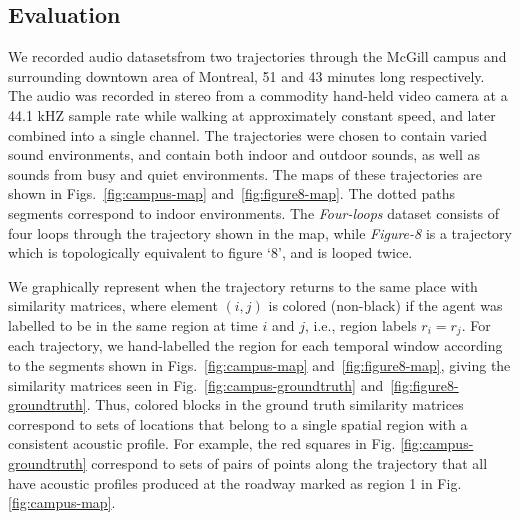 \subsection{Evaluation}

We recorded audio datasetsfrom two trajectories through the McGill campus and surrounding downtown area of Montreal, 51 and 43 minutes long respectively. The audio was recorded in stereo from a commodity hand-held video camera at a 44.1 kHZ sample rate while walking at approximately constant speed, and later combined into a single channel. The trajectories were chosen to contain varied sound environments, and contain both indoor and outdoor sounds, as well as sounds from busy and quiet environments. The maps of these trajectories are shown in Figs.~\ref{fig:campus-map} and~\ref{fig:figure8-map}. The dotted paths segments correspond to indoor environments. The \emph{Four-loops} dataset consists of four loops through the trajectory shown in the map, while \emph{Figure-8} is a trajectory which is topologically equivalent to figure `8', and is looped twice.  

We graphically represent when the trajectory returns to the same place with similarity matrices, where element $(i,j)$ is colored (non-black) if the agent was labelled to be in the same region at time $i$ and $j$, i.e., region labels $r_i = r_j$. For each trajectory, we hand-labelled the region for each temporal window according to the segments shown in Figs.~\ref{fig:campus-map} and~\ref{fig:figure8-map}, giving the similarity matrices seen in Fig.~\ref{fig:campus-groundtruth} and~\ref{fig:figure8-groundtruth}. Thus, colored blocks in the ground truth similarity matrices correspond to sets of locations that belong to a single spatial region with a consistent acoustic profile. For example, the red squares in Fig. \ref{fig:campus-groundtruth} correspond to sets of pairs of points along the trajectory that all have acoustic profiles produced at the roadway marked as region 1 in Fig. \ref{fig:campus-map}. 


